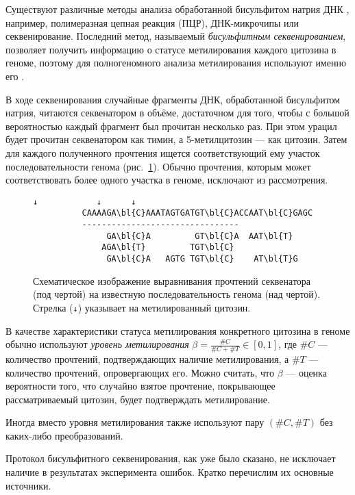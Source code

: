 Существуют различные методы анализа обработанной бисульфитом натрия ДНК \cite{Jones2012}, например,
полимеразная цепная реакция (ПЦР), ДНК\hyp микрочипы или секвенирование. Последний метод, называемый
\emph{бисульфитным секвенированием}, позволяет получить информацию о статусе метилирования каждого
цитозина в геноме, поэтому для полногеномного анализа метилирования используют именно его
\cite{lister2009human,Stadler2011,Xie2013,Ziller2013}.

В ходе секвенирования случайные фрагменты ДНК, обработанной бисульфитом натрия, читаются
секвенатором в объёме, достаточном для того, чтобы с большой вероятностью каждый
фрагмент был прочитан несколько раз. При этом урацил будет прочитан секвенатором как
тимин, а 5-метилцитозин --- как цитозин. Затем для каждого полученного прочтения ищется
соответствующий ему участок последовательности генома (рис.~\ref{fig:bsseq}). Обычно прочтения,
которым может соответствовать более одного участка в геноме, исключают из рассмотрения.

\begin{figure}[h]
  \centering
\begin{Verbatim}[commandchars=\\\{\}]
                 ↓            ↓      ↓
          CAAAAGA\bl{C}AAATAGTGATGT\bl{C}ACCAAT\bl{C}GAGC
          --------------------------------
               GA\bl{C}A         GT\bl{C}A  AAT\bl{T}
              AGA\bl{T}         TGT\bl{C}
               GA\bl{C}A   AGTG TGT\bl{C}    AT\bl{T}G
\end{Verbatim}
  \caption{Схематическое изображение выравнивания прочтений секвенатора (под чертой)
    на известную последовательность генома (над чертой). Стрелка (\texttt{↓}) указывает на
    метилированный цитозин.}
  \label{fig:bsseq}
\end{figure}

В качестве характеристики статуса метилирования конкретного цитозина в геноме обычно
используют \emph{уровень метилирования} ${\beta = \frac{\#C}{\#C + \#T} \in [0, 1]}$, где $\#C$ ---
количество прочтений, подтверждающих наличие метилирования, а $\#T$ --- количество прочтений,
опровергающих его. Можно считать, что $\beta$ --- оценка вероятности того, что случайно
взятое прочтение, покрывающее рассматриваемый цитозин, будет подтверждать метилирование.

Иногда вместо уровня метилирования также используют пару $(\#C, \#T)$ без каких-либо преобразований.

Протокол бисульфитного секвенирования, как уже было сказано, не исключает наличие в результатах
эксперимента ошибок. Кратко перечислим их основные источники.

